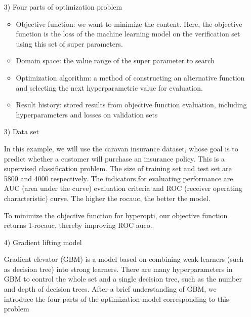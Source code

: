 \documentclass{apmcmthesis}
\begin{document}
\begin{itemize}
\item [3)]Four parts of optimization problem\par
\begin{itemize}
\item Objective function: we want to minimize the content. Here, the objective function is the loss of the machine learning model on the verification set using this set of super parameters.
\item Domain space: the value range of the super parameter to search
\item Optimization algorithm: a method of constructing an alternative function and selecting the next hyperparametric value for evaluation.
\item Result history: stored results from objective function evaluation, including hyperparameters and losses on validation sets
\end{itemize}
\item [3)]Data set\par
\qquad In this example, we will use the caravan insurance dataset, whose goal is to predict whether a customer will purchase an insurance policy. This is a supervised classification problem. The size of training set and test set are 5800 and 4000 respectively. The indicators for evaluating performance are AUC (area under the curve) evaluation criteria and ROC (receiver operating characteristic) curve. The higher the rocauc, the better the model.\par
\qquad To minimize the objective function for hyperopti, our objective function returns 1-rocauc, thereby improving ROC auco.
\item [4)]Gradient lifting model\par
\qquad Gradient elevator (GBM) is a model based on combining weak learners (such as decision tree) into strong learners. There are many hyperparameters in GBM to control the whole set and a single decision tree, such as the number and depth of decision trees. After a brief understanding of GBM, we introduce the four parts of the optimization model corresponding to this problem

\end{itemize}
\end{document}
